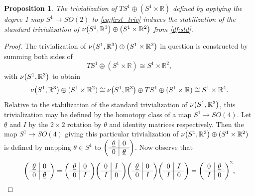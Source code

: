 \documentclass[11pt]{amsart}
\newcommand{\R}{\mathbb R}
\theoremstyle{plain}   %
\newtheorem{prop}[thm]{Proposition}
\theoremstyle{definition}
\theoremstyle{remark}
\numberwithin{equation}{section}
\let\originalleft\left
\let\originalright\right
\renewcommand{\left}{\mathopen{}\mathclose\bgroup\originalleft}
\renewcommand{\right}{\aftergroup\egroup\originalright}
\begin{document}
\begin{prop}
The trivialization of $TS^1\oplus(S^1\times \R)$ defined by applying the degree 1 map $S^1\to SO(2)$ to \cref{eq:first_triv} induces the stabilization of the standard trivialization of $\nu\left( S^1,\R^3\right)\oplus \left(S^1\times\R^2\right)$ from \cref{df:std}.
\end{prop}

\begin{proof}
The trivialization of $\nu\left( S^1,\R^3\right)\oplus \left(S^1\times\R^2\right)$ in question is constructed by summing both sides of
\[
TS^1\oplus (S^1\times \R) \cong S^1\times \R^2,
\]
with $\nu\left(S^1,\R^3\right)$ to obtain 
\[
\nu\left( S^1,\R^3\right) \oplus (S^1\times \R^2) \cong \nu\left( S^1,\R^3\right)\oplus TS^1\oplus(S^1\times\R)\cong S^1\times \R^4.
\]
Relative to the stabilization of the standard trivialization of $\nu\left( S^1,\R^3\right)$, this trivialization may be defined by the homotopy class of a map $S^1\to SO(4)$. Let $\underline{\theta}$ and $I$ by the $2\times 2$ rotation by $\theta$ and identity matrices respectively. Then the map $S^1\to SO(4)$  giving this particular trivialization of $\nu\left( S^1,\R^3\right)\oplus (S^1\times \R^2)$ is defined by mapping $\theta\in S^1$ to $\left(\begin{array}{c|c} \underline{\theta} & 0\\ \hline 0 & \underline{\theta} \end{array} \right)$. Now observe that 
\[
\left(\begin{array}{c|c} \underline{\theta} & 0\\ \hline 0 & \underline{\theta} \end{array} \right) =\left(\begin{array}{c|c} \underline{\theta} & 0\\ \hline 0 & I \end{array} \right)\left(\begin{array}{c|c} 0 & I\\ \hline I & 0 \end{array} \right)\left(\begin{array}{c|c} \underline{\theta} & 0\\ \hline 0 & I \end{array} \right)\left(\begin{array}{c|c} 0 & I\\ \hline I & 0 \end{array} \right) = \left(\begin{array}{c|c} 0 & \underline{\theta}\\ \hline I & 0 \end{array}\right)^2,
\]
\end{proof}
\end{document}
